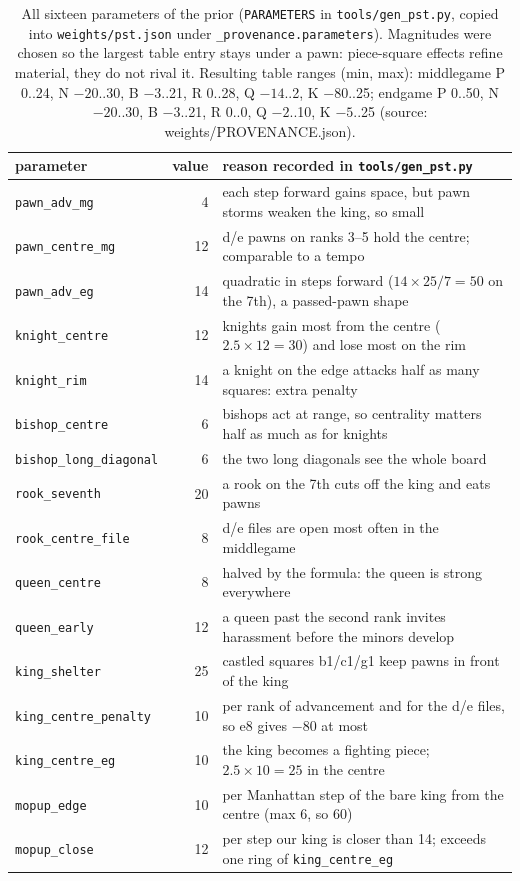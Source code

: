 \documentclass[11pt,a4paper]{article}
\newcommand{\src}[1]{{\small(source: #1)}}
\newcommand{\code}[1]{\texttt{#1}}
\begin{document}
\begin{table}[H]\centering\footnotesize
\begin{tabular}{@{}lr>{\raggedright\arraybackslash}p{10.6cm}@{}}
\toprule
parameter & value & reason recorded in \code{tools/gen\_pst.py} \\
\midrule
\code{pawn\_adv\_mg} & 4 & each step forward gains space, but pawn storms weaken the king, so small \\
\code{pawn\_centre\_mg} & 12 & d/e pawns on ranks 3--5 hold the centre; comparable to a tempo \\
\code{pawn\_adv\_eg} & 14 & quadratic in steps forward ($14 \times 25 / 7 = 50$ on the 7th), a passed-pawn shape \\
\code{knight\_centre} & 12 & knights gain most from the centre ($2.5 \times 12 = 30$) and lose most on the rim \\
\code{knight\_rim} & 14 & a knight on the edge attacks half as many squares: extra penalty \\
\code{bishop\_centre} & 6 & bishops act at range, so centrality matters half as much as for knights \\
\code{bishop\_long\_diagonal} & 6 & the two long diagonals see the whole board \\
\code{rook\_seventh} & 20 & a rook on the 7th cuts off the king and eats pawns \\
\code{rook\_centre\_file} & 8 & d/e files are open most often in the middlegame \\
\code{queen\_centre} & 8 & halved by the formula: the queen is strong everywhere \\
\code{queen\_early} & 12 & a queen past the second rank invites harassment before the minors develop \\
\code{king\_shelter} & 25 & castled squares b1/c1/g1 keep pawns in front of the king \\
\code{king\_centre\_penalty} & 10 & per rank of advancement and for the d/e files, so e8 gives $-80$ at most \\
\code{king\_centre\_eg} & 10 & the king becomes a fighting piece; $2.5 \times 10 = 25$ in the centre \\
\code{mopup\_edge} & 10 & per Manhattan step of the bare king from the centre (max 6, so 60) \\
\code{mopup\_close} & 12 & per step our king is closer than 14; exceeds one ring of \code{king\_centre\_eg} \\
\bottomrule
\end{tabular}
\caption{All sixteen parameters of the prior (\code{PARAMETERS} in \code{tools/gen\_pst.py}, copied into
\code{weights/pst.json} under \code{\_provenance.parameters}). Magnitudes were chosen so the largest table
entry stays under a pawn: piece-square effects refine material, they do not rival it. Resulting table
ranges (min, max): middlegame P 0..24, N $-20$..30, B $-3$..21, R 0..28, Q $-14$..2, K $-80$..25; endgame
P 0..50, N $-20$..30, B $-3$..21, R 0..0, Q $-2$..10, K $-5$..25 \src{weights/PROVENANCE.json}.}
\end{table}
\end{document}
